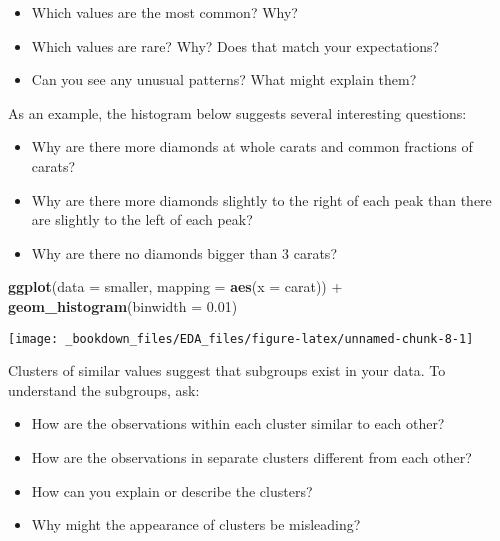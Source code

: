 \documentclass[]{book}
\newenvironment{Shaded}{\begin{snugshade}}{\end{snugshade}}
\newcommand{\KeywordTok}[1]{\textcolor[rgb]{0.13,0.29,0.53}{\textbf{{#1}}}}
\newcommand{\DataTypeTok}[1]{\textcolor[rgb]{0.13,0.29,0.53}{{#1}}}
\newcommand{\FloatTok}[1]{\textcolor[rgb]{0.00,0.00,0.81}{{#1}}}
\newcommand{\StringTok}[1]{\textcolor[rgb]{0.31,0.60,0.02}{{#1}}}
\newcommand{\NormalTok}[1]{{#1}}
\begin{document}
\begin{itemize}
\item
  Which values are the most common? Why?
\item
  Which values are rare? Why? Does that match your expectations?
\item
  Can you see any unusual patterns? What might explain them?
\end{itemize}

As an example, the histogram below suggests several interesting
questions:

\begin{itemize}
\item
  Why are there more diamonds at whole carats and common fractions of
  carats?
\item
  Why are there more diamonds slightly to the right of each peak than
  there are slightly to the left of each peak?
\item
  Why are there no diamonds bigger than 3 carats?
\end{itemize}

\begin{Shaded}
\begin{Highlighting}[]
\KeywordTok{ggplot}\NormalTok{(}\DataTypeTok{data =} \NormalTok{smaller, }\DataTypeTok{mapping =} \KeywordTok{aes}\NormalTok{(}\DataTypeTok{x =} \NormalTok{carat)) +}
\StringTok{  }\KeywordTok{geom_histogram}\NormalTok{(}\DataTypeTok{binwidth =} \FloatTok{0.01}\NormalTok{)}
\end{Highlighting}
\end{Shaded}

\begin{center}\texttt{[image: \_bookdown\_files/EDA\_files/figure-latex/unnamed-chunk-8-1]} \end{center}

Clusters of similar values suggest that subgroups exist in your data. To
understand the subgroups, ask:

\begin{itemize}
\item
  How are the observations within each cluster similar to each other?
\item
  How are the observations in separate clusters different from each
  other?
\item
  How can you explain or describe the clusters?
\item
  Why might the appearance of clusters be misleading?
\end{itemize}
\end{document}
